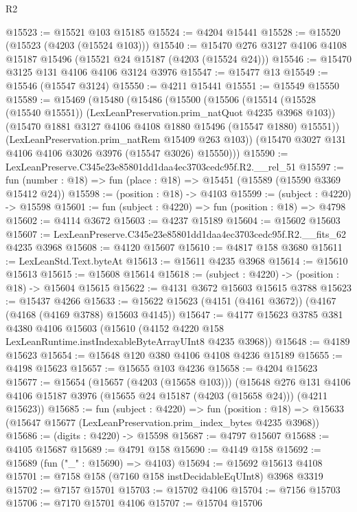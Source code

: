 \begin{lexlean}{R2}
\begin{coremodule}
@15523 := @15521 @103 @15185
@15524 := @4204 @15441
@15528 := @15520 (@15523 (@4203 (@15524 @103)))
@15540 := @15470 @276 @3127 @4106 @4108 @15187 @15496 (@15521 @24 @15187 (@4203 (@15524 @24)))
@15546 := @15470 @3125 @131 @4106 @4106 @3124 @3976
@15547 := @15477 @13
@15549 := @15546 (@15547 @3124)
@15550 := @4211 @15441
@15551 := @15549 @15550
@15589 := @15469
    (@15480
      (@15486
        (@15500
          (@15506
            (@15514 (@15528 (@15540 @15551)) (LexLeanPreservation.prim_natQuot @4235 @3968 @103))
            (@15470 @1881 @3127 @4106 @4108 @1880 @15496 (@15547 @1880) @15551))
          (LexLeanPreservation.prim_natRem @15409 @263 @103))
        (@15470 @3027 @131 @4106 @4106 @3026 @3976 (@15547 @3026) @15550)))
@15590 := LexLeanPreserve.C345e23e85801dd1daa4ec3703cedc95f.R2.__rel_51
@15597 := fun (number : @18) => fun (place : @18) => @15451 (@15589 (@15590 @3369 @15412 @24))
@15598 := (position : @18) -> @4103
@15599 := (subject : @4220) -> @15598
@15601 := fun (subject : @4220) => fun (position : @18) => @4798
@15602 := @4114 @3672
@15603 := @4237 @15189
@15604 := @15602 @15603
@15607 := LexLeanPreserve.C345e23e85801dd1daa4ec3703cedc95f.R2.__fits_62 @4235 @3968
@15608 := @4120 @15607
@15610 := @4817 @158 @3680
@15611 := LexLeanStd.Text.byteAt
@15613 := @15611 @4235 @3968
@15614 := @15610 @15613
@15615 := @15608 @15614
@15618 := (subject : @4220) -> (position : @18) -> @15604 @15615
@15622 := @4131 @3672 @15603 @15615 @3788
@15623 := @15437 @4266
@15633 := @15622 @15623 (@4151 (@4161 @3672)) (@4167 (@4168 (@4169 @3788) @15603 @4145))
@15647 := @4177
    @15623
    @3785
    @381
    @4380
    @4106
    @15603
    (@15610 (@4152 @4220 @158 LexLeanRuntime.instIndexableByteArrayUInt8 @4235 @3968))
@15648 := @4189 @15623
@15654 := @15648 @120 @380 @4106 @4108 @4236 @15189
@15655 := @4198 @15623
@15657 := @15655 @103 @4236
@15658 := @4204 @15623
@15677 := @15654
    (@15657 (@4203 (@15658 @103)))
    (@15648
      @276
      @131
      @4106
      @4106
      @15187
      @3976
      (@15655 @24 @15187 (@4203 (@15658 @24)))
      (@4211 @15623))
@15685 := fun (subject : @4220) =>
  fun (position : @18) => @15633 (@15647 @15677 (LexLeanPreservation.prim_index_bytes @4235 @3968))
@15686 := (digits : @4220) -> @15598
@15687 := @4797 @15607
@15688 := @4105 @15687
@15689 := @4791 @158
@15690 := @4149 @158
@15692 := @15689 (fun ("_" : @15690) => @4103)
@15694 := @15692 @15613 @4108
@15701 := @7158 @158 (@7160 @158 instDecidableEqUInt8) @3968 @3319
@15702 := @7157 @15701
@15703 := @15702 @4106
@15704 := @7156 @15703
@15706 := @7170 @15701 @4106
@15707 := @15704 @15706

\end{coremodule}
\end{lexlean}
